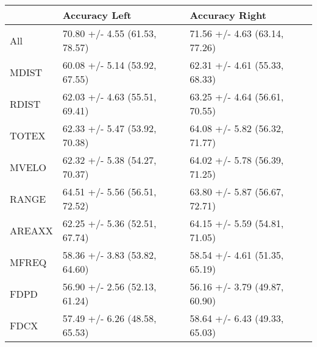 \begin{tabular}{lll}
\toprule
{} &                  Accuracy Left &                 Accuracy Right \\
\midrule
All    &  70.80 +/- 4.55 (61.53, 78.57) &  71.56 +/- 4.63 (63.14, 77.26) \\
MDIST  &  60.08 +/- 5.14 (53.92, 67.55) &  62.31 +/- 4.61 (55.33, 68.33) \\
RDIST  &  62.03 +/- 4.63 (55.51, 69.41) &  63.25 +/- 4.64 (56.61, 70.55) \\
TOTEX  &  62.33 +/- 5.47 (53.92, 70.38) &  64.08 +/- 5.82 (56.32, 71.77) \\
MVELO  &  62.32 +/- 5.38 (54.27, 70.37) &  64.02 +/- 5.78 (56.39, 71.25) \\
RANGE  &  64.51 +/- 5.56 (56.51, 72.52) &  63.80 +/- 5.87 (56.67, 72.71) \\
AREAXX &  62.25 +/- 5.36 (52.51, 67.74) &  64.15 +/- 5.59 (54.81, 71.05) \\
MFREQ  &  58.36 +/- 3.83 (53.82, 64.60) &  58.54 +/- 4.61 (51.35, 65.19) \\
FDPD   &  56.90 +/- 2.56 (52.13, 61.24) &  56.16 +/- 3.79 (49.87, 60.90) \\
FDCX   &  57.49 +/- 6.26 (48.58, 65.53) &  58.64 +/- 6.43 (49.33, 65.03) \\
\bottomrule
\end{tabular}
